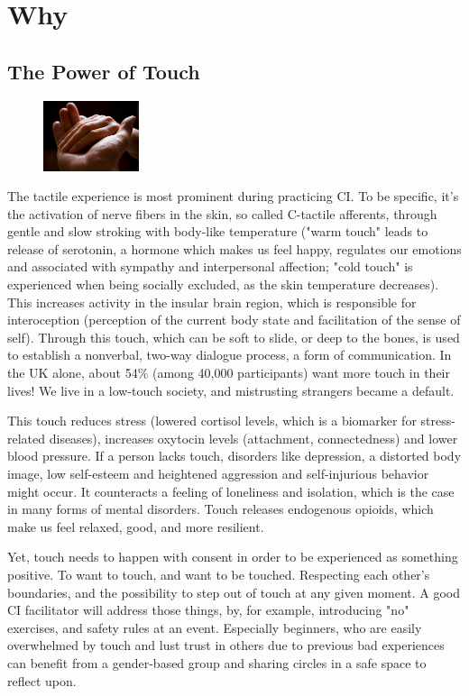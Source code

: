 \section{Why}

\subsection{The Power of Touch}

\begin{figure}
\centering
\includegraphics[width=0.25\textwidth]{images/why.jpg}
\end{figure}

The tactile experience is most prominent during practicing CI. To be specific, it's the activation of nerve fibers in the skin, so called C-tactile afferents, through gentle and slow stroking with body-like temperature ("warm touch" leads to release of serotonin, a hormone which makes us feel happy, regulates our emotions and associated with sympathy and interpersonal affection; "cold touch" is experienced when being socially excluded, as the skin temperature decreases). This increases activity in the insular brain region, which is responsible for interoception (perception of the current body state and facilitation of the sense of self). Through this touch, which can be soft to slide, or deep to the bones, is used to establish a nonverbal, two-way dialogue process, a form of communication. In the UK alone, about 54\% (among 40,000 participants) want more touch in their lives! We live in a low-touch society, and mistrusting strangers became a default.

This touch reduces stress (lowered cortisol levels, which is a biomarker for stress-related diseases), increases oxytocin levels (attachment, connectedness) and lower blood pressure. If a person lacks touch, disorders like depression, a distorted body image, low self-esteem and heightened aggression and self-injurious behavior might occur. It counteracts a feeling of loneliness and isolation, which is the case in many forms of mental disorders. Touch releases endogenous opioids, which make us feel relaxed, good, and more resilient.

Yet, touch needs to happen with consent in order to be experienced as something positive. To want to touch, and want to be touched. Respecting each other's boundaries, and the possibility to step out of touch at any given moment. A good CI facilitator will address those things, by, for example, introducing "no" exercises, and safety rules at an event. Especially beginners, who are easily overwhelmed by touch and lust trust in others due to previous bad experiences can benefit from a gender-based group and sharing circles in a safe space to reflect upon.


